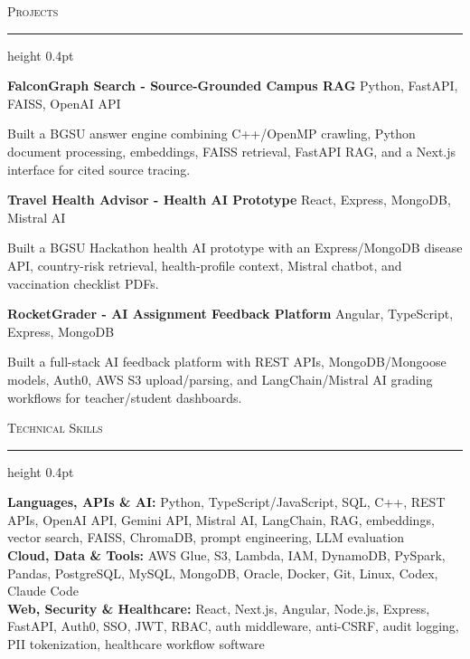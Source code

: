 \documentclass[letterpaper,11pt]{article}
\newcommand{\resumesection}[1]{%
  \par\vspace{2pt}%
  {\large\scshape #1}\par\vspace{2pt}%
  \hrule height 0.4pt\vspace{2pt}%
}
\newcommand{\projectHeading}[2]{
  \textbf{#1} \hfill #2
}
\begin{document}
\resumesection{Projects}
\projectHeading{FalconGraph Search - Source-Grounded Campus RAG}{Python, FastAPI, FAISS, OpenAI API}
\begin{tightitemize}
  \item Built a BGSU answer engine combining C++/OpenMP crawling, Python document processing, embeddings, FAISS retrieval, FastAPI RAG, and a Next.js interface for cited source tracing.
\end{tightitemize}

\projectHeading{Travel Health Advisor - Health AI Prototype}{React, Express, MongoDB, Mistral AI}
\begin{tightitemize}
  \item Built a BGSU Hackathon health AI prototype with an Express/MongoDB disease API, country-risk retrieval, health-profile context, Mistral chatbot, and vaccination checklist PDFs.
\end{tightitemize}

\projectHeading{RocketGrader - AI Assignment Feedback Platform}{Angular, TypeScript, Express, MongoDB}
\begin{tightitemize}
  \item Built a full-stack AI feedback platform with REST APIs, MongoDB/Mongoose models, Auth0, AWS S3 upload/parsing, and LangChain/Mistral AI grading workflows for teacher/student dashboards.
\end{tightitemize}

\resumesection{Technical Skills}
\textbf{Languages, APIs \& AI:} Python, TypeScript/JavaScript, SQL, C++, REST APIs, OpenAI API, Gemini API, Mistral AI, LangChain, RAG, embeddings, vector search, FAISS, ChromaDB, prompt engineering, LLM evaluation\\
\textbf{Cloud, Data \& Tools:} AWS Glue, S3, Lambda, IAM, DynamoDB, PySpark, Pandas, PostgreSQL, MySQL, MongoDB, Oracle, Docker, Git, Linux, Codex, Claude Code\\
\textbf{Web, Security \& Healthcare:} React, Next.js, Angular, Node.js, Express, FastAPI, Auth0, SSO, JWT, RBAC, auth middleware, anti-CSRF, audit logging, PII tokenization, healthcare workflow software
\end{document}
